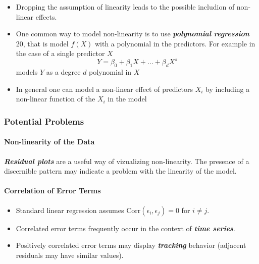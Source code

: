 \documentclass[11pt]{article}
\begin{document}
    \begin{itemize}
\item
  Dropping the assumption of linearity leads to the possible includion
  of non-linear effects.
\item
  One common way to model non-linearity is to use
  \textbf{\emph{polynomial regression}} 20, that is model \(f(X)\) with
  a polynomial in the predictors. For example in the case of a single
  predictor \(X\) \[Y = \beta_0 + \beta_1 X + \dots + \beta_d X^s \]
  models \(Y\) as a degree \(d\) polynomial in \(X\)
\item
  In general one can model a non-linear effect of predictors \(X_i\) by
  including a non-linear function of the \(X_i\) in the model
\end{itemize}

    \hypertarget{potential-problems}{%
\subsubsection{Potential Problems}\label{potential-problems}}

    \hypertarget{non-linearity-of-the-data}{%
\paragraph{Non-linearity of the Data}\label{non-linearity-of-the-data}}

    \textbf{\emph{Residual plots}} are a useful way of vizualizing
non-linearity. The presence of a discernible pattern may indicate a
problem with the linearity of the model.

    \hypertarget{correlation-of-error-terms}{%
\paragraph{Correlation of Error
Terms}\label{correlation-of-error-terms}}

    \begin{itemize}
\item
  Standard linear regression assumes
  \(\text{Corr}(\epsilon_i,\epsilon_j) = 0\) for \(i\neq j\).
\item
  Correlated error terms frequently occur in the context of
  \textbf{\emph{time series}}.
\item
  Positively correlated error terms may display \textbf{\emph{tracking}}
  behavior (adjacent residuals may have similar values).
\end{itemize}
\end{document}
